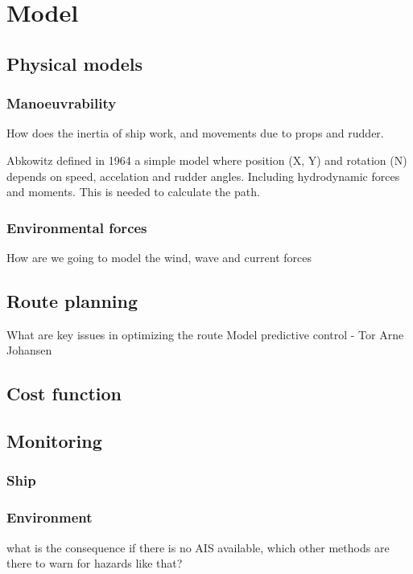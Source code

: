 \section{Model}

\subsection{Physical models}

\subsubsection{Manoeuvrability}
How does the inertia of ship work, and movements due to props and rudder.

Abkowitz defined in 1964 a simple model where position (X, Y) and rotation (N) depends on speed, accelation and rudder angles. Including hydrodynamic forces and moments. This is needed to calculate the path. 

\subsubsection{Environmental forces}
How are we going to model the wind, wave and current forces

\subsection{Route planning}
What are key issues in optimizing the route
Model predictive control - Tor Arne Johansen

\subsection{Cost function}

\subsection{Monitoring}
\subsubsection{Ship}

\subsubsection{Environment}
what is the consequence if there is no AIS available, which other methods are there to warn for hazards like that?

